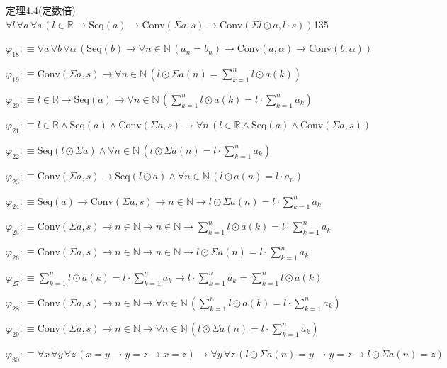 \begin{fullproof}{定理4.4(定数倍)}{$\forall l\,\forall a\,\forall s\,(l \in \mathbb{R} \to \mathrm{Seq}(a) \to \mathrm{Conv}(\Sigma a,s) \to \mathrm{Conv}(\Sigma l \odot a,l \cdot s))$}{135}
\begin{abbrevlist}
\item $\varphi_{18} :\equiv \forall a\,\forall b\,\forall \alpha\,(\mathrm{Seq}(b) \to \forall n \in \mathbb{N}\,(a_{n} = b_{n}) \to \mathrm{Conv}(a,\alpha) \to \mathrm{Conv}(b,\alpha))$
\item $\varphi_{19} :\equiv \mathrm{Conv}(\Sigma a,s) \to \forall n \in \mathbb{N}\,(l \odot \Sigma a(n) = {\textstyle\sum_{k=1}^{n} l \odot a(k)})$
\item $\varphi_{20} :\equiv l \in \mathbb{R} \to \mathrm{Seq}(a) \to \forall n \in \mathbb{N}\,({\textstyle\sum_{k=1}^{n} l \odot a(k)} = l \cdot {\textstyle\sum_{k=1}^{n} a_{k}})$
\item $\varphi_{21} :\equiv l \in \mathbb{R} \land \mathrm{Seq}(a) \land \mathrm{Conv}(\Sigma a,s) \to \forall n\,(l \in \mathbb{R} \land \mathrm{Seq}(a) \land \mathrm{Conv}(\Sigma a,s))$
\item $\varphi_{22} :\equiv \mathrm{Seq}(l \odot \Sigma a) \land \forall n \in \mathbb{N}\,(l \odot \Sigma a(n) = l \cdot {\textstyle\sum_{k=1}^{n} a_{k}})$
\item $\varphi_{23} :\equiv \mathrm{Conv}(\Sigma a,s) \to \mathrm{Seq}(l \odot a) \land \forall n \in \mathbb{N}\,(l \odot a(n) = l \cdot a_{n})$
\item $\varphi_{24} :\equiv \mathrm{Seq}(a) \to \mathrm{Conv}(\Sigma a,s) \to n \in \mathbb{N} \to l \odot \Sigma a(n) = l \cdot {\textstyle\sum_{k=1}^{n} a_{k}}$
\item $\varphi_{25} :\equiv \mathrm{Conv}(\Sigma a,s) \to n \in \mathbb{N} \to n \in \mathbb{N} \to {\textstyle\sum_{k=1}^{n} l \odot a(k)} = l \cdot {\textstyle\sum_{k=1}^{n} a_{k}}$
\item $\varphi_{26} :\equiv \mathrm{Conv}(\Sigma a,s) \to n \in \mathbb{N} \to n \in \mathbb{N} \to l \odot \Sigma a(n) = l \cdot {\textstyle\sum_{k=1}^{n} a_{k}}$
\item $\varphi_{27} :\equiv {\textstyle\sum_{k=1}^{n} l \odot a(k)} = l \cdot {\textstyle\sum_{k=1}^{n} a_{k}} \to l \cdot {\textstyle\sum_{k=1}^{n} a_{k}} = {\textstyle\sum_{k=1}^{n} l \odot a(k)}$
\item $\varphi_{28} :\equiv \mathrm{Conv}(\Sigma a,s) \to n \in \mathbb{N} \to \forall n \in \mathbb{N}\,({\textstyle\sum_{k=1}^{n} l \odot a(k)} = l \cdot {\textstyle\sum_{k=1}^{n} a_{k}})$
\item $\varphi_{29} :\equiv \mathrm{Conv}(\Sigma a,s) \to n \in \mathbb{N} \to \forall n \in \mathbb{N}\,(l \odot \Sigma a(n) = l \cdot {\textstyle\sum_{k=1}^{n} a_{k}})$
\item $\varphi_{30} :\equiv \forall x\,\forall y\,\forall z\,(x = y \to y = z \to x = z) \to \forall y\,\forall z\,(l \odot \Sigma a(n) = y \to y = z \to l \odot \Sigma a(n) = z)$

\end{abbrevlist}
\end{fullproof}
